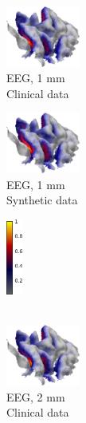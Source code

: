 \documentclass[5p]{elsarticle}
\begin{document}
\begin{figure}[h!]
\begin{footnotesize}
\begin{center}
\begin{minipage}{3cm} \begin{center}
\includegraphics[height=2.0cm]{MAP_EEG_IG_1mm.png} \\ EEG, 1 mm \\ Clinical data
\end{center}\end{minipage}
\begin{minipage}{3cm} \begin{center}
\includegraphics[height=2.0cm]{MAP_EEG_IG_1mm_syntheticdata.png} \\ EEG, 1 mm \\ Synthetic data
\end{center}\end{minipage}\begin{minipage}{0.5cm} \begin{center}
\includegraphics[height=2.5cm]{colorbar.png} \\ \mbox{}  \\ \mbox{}
\end{center}
\end{minipage} \vskip0.2cm
\begin{minipage}{3cm} \begin{center}
\includegraphics[height=2.0cm]{MAP_EEG_IG_2mm.png}\\ EEG, 2 mm \\ Clinical data

\end{center}
\end{minipage}
\end{center}
\end{footnotesize}
\end{figure}
\end{document}
